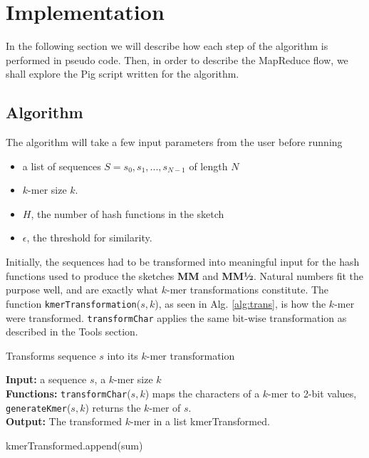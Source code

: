 \documentclass[../../main.tex]{subfiles}
\begin{document}
\section{Implementation}

In the following section we will describe how each step of the algorithm is performed in pseudo code. Then, in order to describe the MapReduce flow, we shall explore the Pig script written for the algorithm.


\subsection{Algorithm}
The algorithm will take a few input parameters from the user before running
\begin{itemize}
\item a list of sequences $S={s_0,s_1,...,s_{N-1}}$ of length $N$
\item $k$-mer size $k$.
\item $H$, the number of hash functions in the sketch
\item $\epsilon$, the threshold for similarity.  
\end{itemize}

Initially, the sequences had to be  transformed into meaningful input for the hash functions used to produce the sketches {\bf MM} and {\bf MM½}. Natural numbers fit the purpose well, and are exactly what $k$-mer transformations constitute. The function \texttt{kmerTransformation}($s,k$), as seen in Alg. \ref{alg:trans}, is how the $k$-mer were transformed. \texttt{transformChar} applies the same bit-wise transformation as described in the Tools section. 

\begin{algorithm}
\caption{Transforms sequence $s$ into its $k$-mer transformation}\label{alg:trans}
\textbf{Input:} a sequence $s$, a $k$-mer size $k$\\
\textbf{Functions:} \texttt{transformChar}($s,k$) maps the characters of a $k$-mer to 2-bit values, \texttt{generateKmer}($s,k$) returns the $k$-mer of $s$.\\
\textbf{Output:} The transformed $k$-mer in a list kmerTransformed.
\begin{algorithmic}[1]
\Statex
{}
	
	 
		\EndFor
		\State kmerTransformed.append(sum)
	\EndFor
\State {}
\EndFunction
\end{algorithmic}
\end{algorithm}
\end{document}
